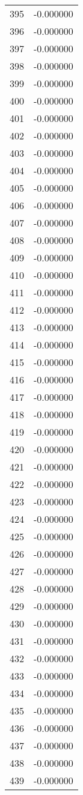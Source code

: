 \documentclass[12pt]{article}
\begin{document}
\begin{longtable}{@{}cc@{}}
395 & -0.000000 \\
396 & -0.000000 \\
397 & -0.000000 \\
398 & -0.000000 \\
399 & -0.000000 \\
400 & -0.000000 \\
401 & -0.000000 \\
402 & -0.000000 \\
403 & -0.000000 \\
404 & -0.000000 \\
405 & -0.000000 \\
406 & -0.000000 \\
407 & -0.000000 \\
408 & -0.000000 \\
409 & -0.000000 \\
410 & -0.000000 \\
411 & -0.000000 \\
412 & -0.000000 \\
413 & -0.000000 \\
414 & -0.000000 \\
415 & -0.000000 \\
416 & -0.000000 \\
417 & -0.000000 \\
418 & -0.000000 \\
419 & -0.000000 \\
420 & -0.000000 \\
421 & -0.000000 \\
422 & -0.000000 \\
423 & -0.000000 \\
424 & -0.000000 \\
425 & -0.000000 \\
426 & -0.000000 \\
427 & -0.000000 \\
428 & -0.000000 \\
429 & -0.000000 \\
430 & -0.000000 \\
431 & -0.000000 \\
432 & -0.000000 \\
433 & -0.000000 \\
434 & -0.000000 \\
435 & -0.000000 \\
436 & -0.000000 \\
437 & -0.000000 \\
438 & -0.000000 \\
439 & -0.000000 \\

\end{longtable}
\end{document}
